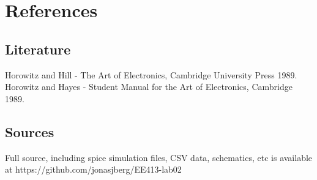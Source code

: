 \documentclass[11pt,a4paper]{article}
\begin{document}
\newpage

\section{References}\label{references}

\subsection{Literature}\label{literature}
Horowitz and Hill - The Art of Electronics, Cambridge University Press
1989. Horowitz and Hayes - Student Manual for the Art of Electronics,
Cambridge 1989.

\subsection{Sources}\label{sources}
Full source, including spice simulation files, CSV data, schematics, etc
is available at https://github.com/jonasjberg/EE413-lab02


\end{document}
